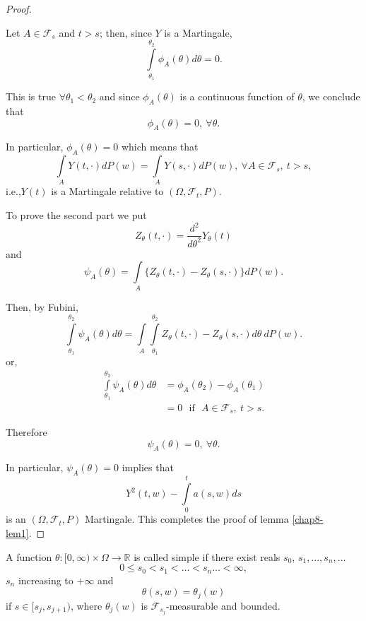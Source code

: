 \begin{proof}
\begin{step}
Let $A\in\mathscr{F}_{s}$ and $t>s$; then, since $Y$ is a Martingale,
$$
\int\limits^{\theta_{2}}_{\theta_{1}}\phi_{A}(\theta)d\theta=0.
$$

This is true $\forall \theta_{1}<\theta_{2}$ and since
$\phi_{A}(\theta)$ is a continuous function of $\theta$, we conclude
that
$$
\phi_{A}(\theta)=0,\ \forall \theta.
$$

In particular, $\phi_{A}(\theta)=0$ which means that
$$
\int\limits_{A}Y(t,\cdot)dP(w)=\int\limits_{A}Y(s,\cdot)dP(w),\ \forall
A\in \mathscr{F}_{s},\ t>s,
$$
i.e.,\pageoriginale $Y(t)$ is a Martingale relative to $(\Omega,\mathscr{F}_{t},P)$.
\end{step}

To prove the second part we put
$$
Z_{\theta}(t,\cdot)=\frac{d^{2}}{d\theta^{2}}Y_{\theta}(t)
$$
and 
$$
\psi_{A}(\theta)=\int\limits_{A}\{Z_{\theta}(t,\cdot)-Z_{\theta}(s,\cdot)\}dP(w). 
$$

Then, by Fubini,
$$
\int\limits^{\theta_{2}}_{\theta_{1}}\psi_{A}(\theta)d\theta=\int\limits_{A}\int\limits^{\theta_{2}}_{\theta_{1}}Z_{\theta}(t,\cdot)-Z_{\theta}(s,\cdot)d\theta\ dP(w). 
$$
or,
\begin{align*}
\int\limits^{\theta_{2}}_{\theta_{1}}\psi_{A}(\theta)d\theta
&=\phi_{A}(\theta_{2})-\phi_{A}(\theta_{1})\\
&= 0\text{~ if~ } A\in \mathscr{F}_{s},\ t>s.
\end{align*}

Therefore
$$
\psi_{A}(\theta)=0,\ \forall \theta.
$$

In particular, $\psi_{A}(\theta)=0$ implies that
$$
Y^{2}(t,w)-\int\limits^{t}_{0}a(s,w)ds
$$
is an $(\Omega,\mathscr{F}_{t},P)$ Martingale. This completes the
proof of lemma \ref{chap8-lem1}.
\end{proof}

\begin{defi*}
A function $\theta:[0,\infty)\times \Omega\to \mathbb{R}$ is called
  simple if there exist reals $s_{0}$, $s_{1},\ldots,s_{n},\ldots$
$$
0\leq s_{0}<s_{1}<\ldots<s_{n}\ldots<\infty,
$$
$s_{n}$ increasing to $+\infty$ and
$$
\theta(s,w)=\theta_{j}(w)
$$\pageoriginale
if $s\in [s_{j},s_{j+1})$, where $\theta_{j}(w)$ is
  $\mathscr{F}_{s_{j}}$-measurable and bounded.
\end{defi*}

